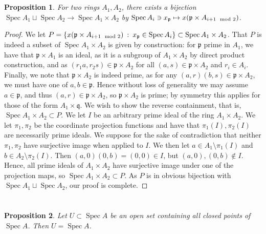 \documentclass[english]{article}
\DeclareMathOperator{\Spec}{Spec}
\DeclareMathOperator{\spec}{Spec}
\newcommand{\pfr}{\mathfrak{p}}
\newcommand{\qfr}{\mathfrak{q}}
\newcommand{\prob}[1]{\setcounter{section}{#1-1}\section{}}
\newtheorem*{proposition*}{Proposition}
\theoremstyle{remark}
\theoremstyle{definition}
\begin{document}
\prob{2} \begin{proposition*}
 For two rings $A_1,A_2$, there exists a bijection $\Spec A_1\sqcup \Spec A_2\to \Spec A_1\times A_2$ by $\Spec A_i\ni x_\pfr\mapsto x(\pfr \times A_{i+1\vspace*{-5pt}\mod 2})$. 
\end{proposition*}
\begin{proof}
	We let $P=\{x(\pfr \times A_{i+1\vspace*{-5pt}\mod 2})\::\:x_\pfr \in \Spec A_i\}\subset \Spec A_1\times A_2$. That $P$ is indeed a subset of $\Spec A_1 \times A_2$ is given by construction: for $\pfr$ prime in $A_1$, we have that $\pfr\times A_1$ is an ideal, as it is a subgroup of $A_1\times A_2$ by direct product construction, and as $(r_1a,r_2s)\in \pfr \times A_2$ for all $(a,s)\in \pfr\times A_2$ and $r_i\in A_i$. Finally, we note that $\pfr\times A_2$ is indeed prime, as for any $(a,r)(b,s)\in \pfr\times A_2$, we must have one of $a,b\in \pfr$. Hence without loss of generality we may assume $a\in \pfr$, and thus $(a,r)\in \pfr\times A_2$, so $\pfr\times A_2$ is prime; by symmetry this applies for those of the form $A_1\times \qfr$. We wish to show the reverse containment, that is, $\Spec A_1 \times A_2\subset P$. We let $I$ be an arbitrary prime ideal of the ring $A_1\times A_2$. We let $\pi_1,\pi_2$ be the coordinate projection functions and have that $\pi_1(I),\pi_2(I)$ are necessarily prime ideals. We suppose for the sake of contradiction that neither $\pi_1,\pi_2$ have surjective image when applied to $I$. We then let $a\in A_1\setminus\pi_1(I)$ and $b\in A_2\setminus \pi_2(I)$. Then $(a,0)(0,b)=(0,0)\in I$, but $(a,0),(0,b)\not \in I$. Hence, all prime ideals of $A_1\times A_2$ have surjective image under one of the projection maps, so $\Spec A_1\times A_2\subset P$. As $P$ is in obvious bijection with $\Spec A_1\sqcup \Spec A_2$, our proof is complete.
\end{proof}
\prob{3}
\begin{proposition*}
	Let $U\subset \Spec A$ be an open set containing all closed points of $\spec A$. Then $U=\spec A$.
\end{proposition*}
\end{document}
